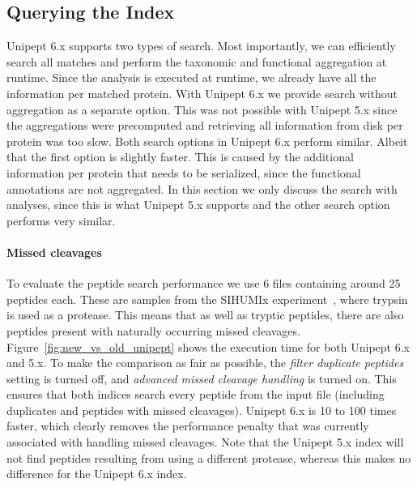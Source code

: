 \documentclass[11pt]{article}
\begin{document}
\begin{multicols}{2}
        \subsection{Querying the Index}
        Unipept 6.x supports two types of search.
        Most importantly, we can efficiently search all matches and perform the taxonomic and functional aggregation at runtime.
        Since the analysis is executed at runtime, we already have all the information per matched protein.
        With Unipept 6.x we provide search without aggregation as a separate option.
        This was not possible with Unipept 5.x since the aggregations were precomputed and retrieving all information from disk per protein was too slow.
        Both search options in Unipept 6.x perform similar.
        Albeit that the first option is slightly faster.
        This is caused by the additional information per protein that needs to be serialized, since the functional annotations are not aggregated.
        In this section we only discuss the search with analyses, since this is what Unipept 5.x supports and the other search option performs very similar.

        \paragraph{Missed cleavages}
        To evaluate the peptide search performance we use 6 files containing around 25 peptides each.
        These are samples from the SIHUMIx experiment~\cite{SIHUMI_frequently_used, SIHUMI_first_introduction}, where trypsin is used as a protease.
        This means that as well as tryptic peptides, there are also peptides present with naturally occurring missed cleavages.
        Figure~\ref{fig:new_vs_old_unipept} shows the execution time for both Unipept 6.x and 5.x.
        To make the comparison as fair as possible, the \textit{filter duplicate peptides} setting is turned off, and \textit{advanced missed cleavage handling} is turned on.
        This ensures that both indices search every peptide from the input file (including duplicates and peptides with missed cleavages).
        Unipept 6.x is 10 to 100 times faster, which clearly removes the performance penalty that was currently associated with handling missed cleavages.
        Note that the Unipept 5.x index will not find peptides resulting from using a different protease, whereas this makes no difference for the Unipept 6.x index.


\end{multicols}
\end{document}
